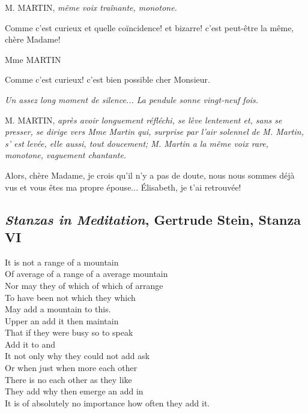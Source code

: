 \documentclass{article}
\begin{document}
			\begin{center}
				M. MARTIN, \textit{même voix traînante, monotone.}
			\end{center}
			Comme c'est curieux et quelle coïncidence! et
			bizarre! c'est peut-être la même, chère Madame!\\
			
			\begin{center}
				Mme MARTIN
			\end{center}
			Comme c'est curieux! c'est bien possible cher
			Monsieur.
			\begin{center}
				\textit{Un assez long moment de silence... La pendule
				sonne vingt-neuf fois.}\\
			\end{center}
			\begin{center}
				M. MARTIN, \textit{après avoir longuement réfléchi,
				se lève lentement et, sans se presser, se dirige
				vers Mme Martin qui, surprise par l'air solennel
				de M. Martin, s' est levée, elle aussi, tout doucement;
				M. Martin a la même voix rare,
				monotone, vaguement chantante.}
			\end{center}
			Alors, chère Madame, je crois qu'il n'y a pas de
			doute, nous nous sommes déjà vus et vous êtes ma
			propre épouse... Élisabeth, je t'ai retrouvée!
		\subsection{\textit{Stanzas in Meditation}, Gertrude Stein, {Stanza VI}}\label{stein_stanza}
			It is not a range of a mountain\\
			Of average of a range of a average mountain\\
			Nor may they of which of which of arrange\\
			To have been not which they which\\
			May add a mountain to this.\\
			Upper an add it then maintain\\
			That if they were busy so to speak\\
			Add it to and\\
			It not only why they could not add ask\\
			Or when just when more each other\\
			There is no each other as they like\\
			They add why then emerge an add in\\
			It is of absolutely no importance how often they add it.\\
			
		
\end{document}
